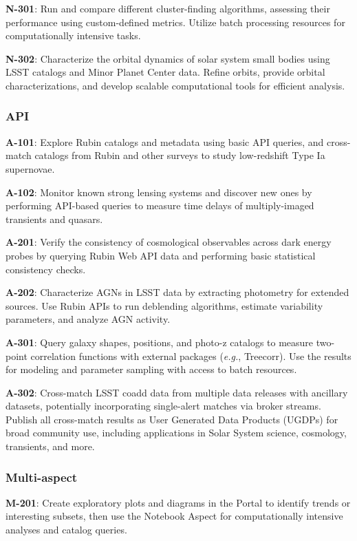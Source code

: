 \textbf{N-301}: Run and compare different cluster-finding algorithms, assessing their performance using custom-defined metrics. Utilize batch processing resources for computationally intensive tasks.

\textbf{N-302}: Characterize the orbital dynamics of solar system small bodies using LSST catalogs and Minor Planet Center data. Refine orbits, provide orbital characterizations, and develop scalable computational tools for efficient analysis.

\subsubsection{API}

\textbf{A-101}: Explore Rubin catalogs and metadata using basic API queries, and cross-match catalogs from Rubin and other surveys to study low-redshift Type Ia supernovae.

\textbf{A-102}: Monitor known strong lensing systems and discover new ones by performing API-based queries to measure time delays of multiply-imaged transients and quasars.

\textbf{A-201}: Verify the consistency of cosmological observables across dark energy probes by querying Rubin Web API data and performing basic statistical consistency checks.

\textbf{A-202}: Characterize AGNs in LSST data by extracting photometry for extended sources. Use Rubin APIs to run deblending algorithms, estimate variability parameters, and analyze AGN activity.

\textbf{A-301}: Query galaxy shapes, positions, and photo-z catalogs to measure two-point correlation functions with external packages (\emph{e.g.}, Treecorr). Use the results for modeling and parameter sampling with access to batch resources.

\textbf{A-302}: Cross-match LSST coadd data from multiple data releases with ancillary datasets, potentially incorporating single-alert matches via broker streams. Publish all cross-match results as User Generated Data Products (UGDPs) for broad community use, including applications in Solar System science, cosmology, transients, and more.

\subsubsection{Multi-aspect}

\textbf{M-201}: Create exploratory plots and diagrams in the Portal to identify trends or interesting subsets, then use the Notebook Aspect for computationally intensive analyses and catalog queries.
